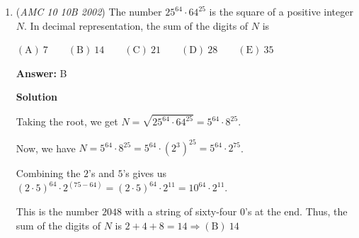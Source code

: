 \begin{enumerate}
 $\textbf{(A) } \frac23 \qquad \textbf{(B) } \frac32 \text{ or } -\frac14 \qquad \textbf{(C) } -\frac23 \text{ or } -\frac14 \qquad \textbf{(D) } \frac32 \qquad \textbf{(E) } -\frac32 \text{ or } -\frac14$

 \textbf{Answer: }D



\textbf{Solution}

We have $8xy - 12y + 2x - 3 = 4y(2x - 3) + (2x - 3) = (4y + 1)(2x - 3)$. 

 As $(4y + 1)(2x - 3) = 0$ must be true for all $y$, we must have $2x - 3 = 0$, hence $\boxed{x = \frac 32\ \mathrm{ (D)}}$.

 



\textbf{Solution 2}

Since we want only the $y$-variable to be present, we move the terms only with the $y$-variable to one side, thus constructing $8xy - 12y + 2x - 3 = 0$ to $8xy + 2x = 12y + 3$. For there to be infinite solutions for $y$ and there is no $x$, we simply find a value of $x$ such that the equation is symmetrical. Therefore,

 $2x = 3$
$8xy = 12y$

 There is only one solution, namely $x = \boxed{\dfrac{3}{2}}$ or $\text{(D)}$



	\item (\textit{AMC 10 10B 2002}) The number $25^{64}\cdot 64^{25}$ is the square of a positive integer $N$. In decimal representation, the sum of the digits of $N$ is


 $\mathrm{(A) \ } 7\qquad \mathrm{(B) \ } 14\qquad \mathrm{(C) \ } 21\qquad \mathrm{(D) \ } 28\qquad \mathrm{(E) \ } 35$

 \textbf{Answer: }B



\textbf{Solution}

Taking the root, we get $N=\sqrt{25^{64}\cdot 64^{25}}=5^{64}\cdot 8^{25}$.

 Now, we have $N=5^{64}\cdot 8^{25}=5^{64}\cdot (2^{3})^{25}=5^{64}\cdot 2^{75}$.

 Combining the $2$'s and $5$'s gives us $(2\cdot 5)^{64}\cdot 2^{(75-64)}=(2\cdot 5)^{64}\cdot 2^{11}=10^{64}\cdot 2^{11}$. 

 This is the number $2048$ with a string of sixty-four $0$'s at the end. Thus, the sum of the digits of $N$ is $2+4+8=14\Longrightarrow\boxed{\mathrm{ (B)}\ 14}$




\end{enumerate}
